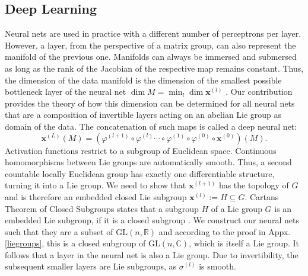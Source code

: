 \documentclass[envcountsect,runningheads]{llncs}
\begin{document}
\subsection{Deep Learning}

Neural nets are used in practice with a different number of perceptrons per layer. However, a layer, from the perspective of a matrix group, can also represent the manifold of the previous one. Manifolds can always be immersed and submersed as long as the rank of the Jacobian of the respective map remains constant. Thus, the dimension of the data manifold is the dimension of the smallest possible bottleneck layer of the neural net  $\dim M = \min_l \dim \textbf{x}^{(l)}$ . Our contribution provides the theory of how this dimension can be determined for all neural nets that are a composition of invertible layers acting on an abelian Lie group as domain of the data. The concatenation of such maps is called a deep neural net:
\begin{equation}
    \textbf{x}^{(L)}(M) = \left(\varphi^{(l+1)} \circ \varphi^{(l)} \cdots \circ \varphi^{(1)} \circ \varphi^{(0)} \circ \textbf{x}^{(0)}\right)(M).
\end{equation}
Activation functions restrict to a subgroup of Euclidean space. Continuous homomorphisms between Lie groups are automatically smooth. Thus, a second countable locally Euclidean group has exactly one differentiable structure, turning it into a Lie group. We need to show that $\textbf{x}^{(l+1)}$ has the topology of $G$ and is therefore an embedded closed Lie subgroup $\textbf{x}^{(l)} := H \subseteq G$. Cartans Theorem of Closed Subgroups states that a subgroup $H$ of a Lie group $G$ is an embedded Lie subgroup, if it is a closed subgroup . We construct our neural nets such that they are a subset of $\text{GL}(n,\mathbb{R})$ and according to the proof in Appx. \ref{liegroups}, this is a closed subgroup of $\text{GL}(n,\mathbb{C})$, which is itself a Lie group. It follows that a layer in the neural net is also a Lie group. Due to invertibility, the subsequent smaller layers are Lie subgroups, as $\sigma^{(l)}$ is smooth.
\end{document}
